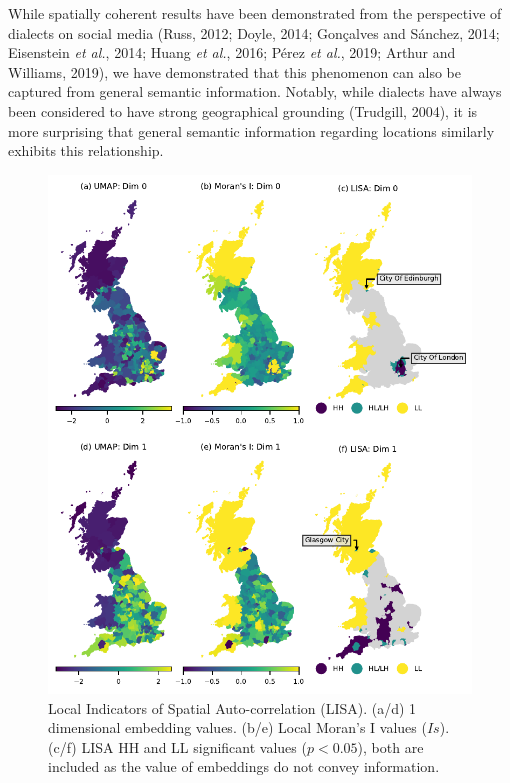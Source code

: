 \documentclass[
  letterpaper,
  11pt,
  english,
  onehalfspacing,
  headsepline]{MastersDoctoralThesis}
\begin{document}
While spatially coherent results have been demonstrated from the
perspective of dialects on social media (Russ, 2012; Doyle, 2014;
Gonçalves and Sánchez, 2014; Eisenstein \emph{et al.}, 2014; Huang
\emph{et al.}, 2016; Pérez \emph{et al.}, 2019; Arthur and Williams,
2019), we have demonstrated that this phenomenon can also be captured
from general semantic information. Notably, while dialects have always
been considered to have strong geographical grounding (Trudgill, 2004),
it is more surprising that general semantic information regarding
locations similarly exhibits this relationship.

\begin{figure}

{\centering \includegraphics{05_footprint/05_figures/fig-lisa-output-1.pdf}

}

\caption{\label{fig-lisa}Local Indicators of Spatial Auto-correlation
(LISA). (a/d) 1 dimensional embedding values. (b/e) Local Moran's I
values (\(Is\)). (c/f) LISA HH and LL significant values (\(p<0.05\)),
both are included as the value of embeddings do not convey information.}

\end{figure}
\end{document}
